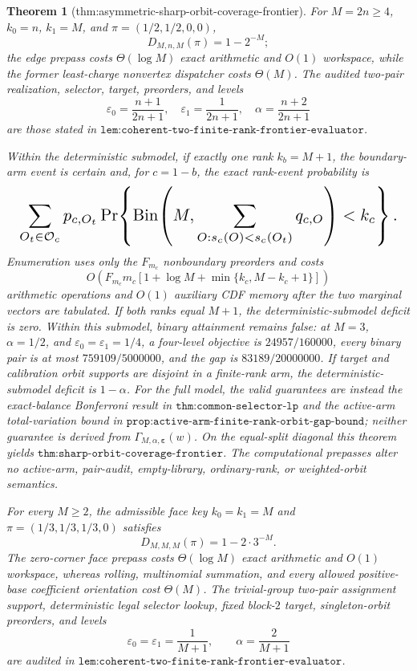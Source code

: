 \documentclass{article}
\newtheorem{theorem}{Theorem}
\begin{document}
\begin{theorem}[thm:asymmetric-sharp-orbit-coverage-frontier]
For \(M=2n\ge4\), \(k_0=n\), \(k_1=M\), and \(\pi=(1/2,1/2,0,0)\),
\[
D_{M,n,M}(\pi)=1-2^{-M};
\]
the edge prepass costs \(\Theta(\log M)\) exact arithmetic and \(O(1)\) workspace, while the former least-charge nonvertex dispatcher costs \(\Theta(M)\). The audited two-pair realization, selector, target, preorders, and levels
\[
\varepsilon_0=\frac{n+1}{2n+1},\quad
\varepsilon_1=\frac1{2n+1},\quad
\alpha=\frac{n+2}{2n+1}
\]
are those stated in \(\texttt{lem:coherent-two-finite-rank-frontier-evaluator}\).

Within the deterministic submodel, if exactly one rank \(k_b=M+1\), the boundary-arm event is certain and, for \(c=1-b\), the exact rank-event probability is
\[
\makebox[\linewidth][c]{\resizebox{0.98\linewidth}{!}{\(\displaystyle \sum_{O_t\in\mathcal O_c}p_{c,O_t}
\Pr\!\left\{\operatorname{Bin}\!\left(M,
\sum_{O:s_c(O)<s_c(O_t)}q_{c,O}\right)<k_c\right\}.\)}}
\]
Enumeration uses only the \(F_{m_c}\) nonboundary preorders and costs
\[
O\!\left(F_{m_c}m_c[1+\log M+\min\{k_c,M-k_c+1\}]\right)
\]
arithmetic operations and \(O(1)\) auxiliary CDF memory after the two marginal vectors are tabulated. If both ranks equal \(M+1\), the deterministic-submodel deficit is zero. Within this submodel, binary attainment remains false: at \(M=3\), \(\alpha=1/2\), and \(\varepsilon_0=\varepsilon_1=1/4\), a four-level objective is \(24957/160000\), every binary pair is at most \(759109/5000000\), and the gap is \(83189/20000000\). If target and calibration orbit supports are disjoint in a finite-rank arm, the deterministic-submodel deficit is \(1-\alpha\). For the full model, the valid guarantees are instead the exact-balance Bonferroni result in \(\texttt{thm:common-selector-lp}\) and the active-arm total-variation bound in \(\texttt{prop:active-arm-finite-rank-orbit-gap-bound}\); neither guarantee is derived from \(\Gamma_{M,\alpha,\boldsymbol\varepsilon}(w)\). On the equal-split diagonal this theorem yields \(\texttt{thm:sharp-orbit-coverage-frontier}\). The computational prepasses alter no active-arm, pair-audit, empty-library, ordinary-rank, or weighted-orbit semantics.

For every \(M\ge2\), the admissible face key \(k_0=k_1=M\) and \(\pi=(1/3,1/3,1/3,0)\) satisfies
\[
D_{M,M,M}(\pi)=1-2\cdot3^{-M}.
\]
The zero-corner face prepass costs \(\Theta(\log M)\) exact arithmetic and \(O(1)\) workspace, whereas rolling, multinomial summation, and every allowed positive-base coefficient orientation cost \(\Theta(M)\). The trivial-group two-pair assignment support, deterministic legal selector lookup, fixed block-\(2\) target, singleton-orbit preorders, and levels
\[
\varepsilon_0=\varepsilon_1=\frac1{M+1},
\qquad
\alpha=\frac2{M+1}
\]
are audited in \(\texttt{lem:coherent-two-finite-rank-frontier-evaluator}\).


\end{theorem}
\end{document}
